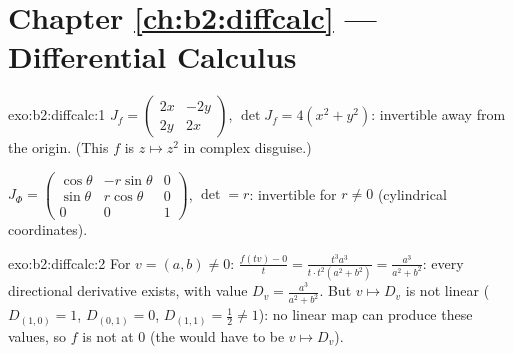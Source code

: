 \section*{Chapter \ref{ch:b2:diffcalc} --- Differential Calculus}

\begin{solution}{exo:b2:diffcalc:1}
$J_f = \begin{pmatrix} 2x & -2y\\ 2y & 2x\end{pmatrix}$, $\det J_f
= 4(x^2 + y^2)$: invertible away from the origin. (This $f$ is $z
\mapsto z^2$ in complex disguise.)

$J_\Phi = \begin{pmatrix} \cos\theta & -r\sin\theta & 0\\
\sin\theta & r\cos\theta & 0\\ 0 & 0 & 1\end{pmatrix}$, $\det = r$:
invertible for $r \neq 0$ (cylindrical coordinates).
\end{solution}

\begin{solution}{exo:b2:diffcalc:2}
For $v = (a, b) \neq 0$: $\frac{f(tv) - 0}{t} = \frac{t^3a^3}{t\cdot
t^2(a^2+b^2)} = \frac{a^3}{a^2 + b^2}$: every directional
derivative exists, with value $D_v = \frac{a^3}{a^2+b^2}$. But $v
\mapsto D_v$ is not linear ($D_{(1,0)} = 1$, $D_{(0,1)} = 0$,
$D_{(1,1)} = \frac12 \neq 1$): no linear map can produce these
values, so $f$ is not  at $0$ (the  would
have to be $v \mapsto D_v$).
\end{solution}


